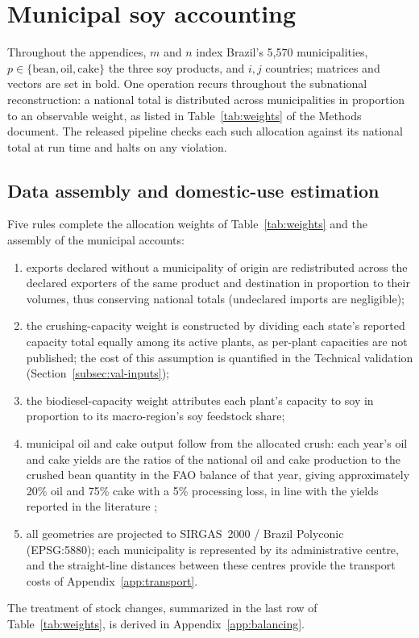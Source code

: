 \section{Municipal soy accounting}\label{app:accounting}

Throughout the appendices, $m$ and $n$ index Brazil's 5{,}570
municipalities, $p\in\{\text{bean},\text{oil},\text{cake}\}$ the three soy
products, and $i,j$ countries; matrices and vectors are set in bold.
One operation recurs throughout the subnational reconstruction:
a national total is distributed across municipalities in proportion to
an observable weight, as listed in Table~\ref{tab:weights} of the
Methods document. The released pipeline checks each such allocation
against its national total at run time and halts on any violation.

\subsection{Data assembly and domestic-use estimation}\label{subsubsec:domuse}
\label{subsubsec:assemble}
Five rules complete the allocation weights of Table~\ref{tab:weights}
and the assembly of the municipal accounts:
\begin{enumerate}
\item exports declared without a municipality of origin are
redistributed across the declared exporters of the same product and
destination in proportion to their volumes, thus conserving national
totals (undeclared imports are negligible);
\item the crushing-capacity weight is constructed by dividing each
state's reported capacity total equally among its active plants, as
per-plant capacities are not published; the cost of this assumption is
quantified in the Technical validation
(Section~\ref{subsec:val-inputs});
\item the biodiesel-capacity weight attributes each plant's capacity
to soy in proportion to its macro-region's soy feedstock share;
\item municipal oil and cake output follow from the allocated crush:
each year's oil and cake yields are the ratios of the national oil and
cake production to the crushed bean quantity in the FAO balance of
that year, giving approximately 20\% oil and 75\% cake with a 5\%
processing loss, in line with the yields reported in the literature
\cite{smaling2008soy,dei2011soybean};
\item all geometries are projected to SIRGAS~2000 / Brazil Polyconic
(EPSG:5880); each municipality is represented by its administrative
centre, and the straight-line distances between these centres provide
the transport costs of Appendix~\ref{app:transport}.
\end{enumerate}
The treatment of stock changes, summarized in the last row of
Table~\ref{tab:weights}, is derived in Appendix~\ref{app:balancing}.

